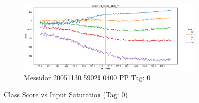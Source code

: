\begin{figure}[ht!]
\begin{subfigure}[b]{ 0.85\textwidth}
		\centering
		\includegraphics[width=\textwidth]{Figures/chapter_stability/20051130_59029_0400_PP/s/scores.png}
		\caption{Messidor 20051130 59029 0400 PP Tag: 0}		
	\end{subfigure}
	\hfill 
	\caption[Score vs Saturation (Tag: 0)]{Class Score vs Input Saturation (Tag: 0)}  
	\label{sta:fig:sat0} 
\end{figure}

